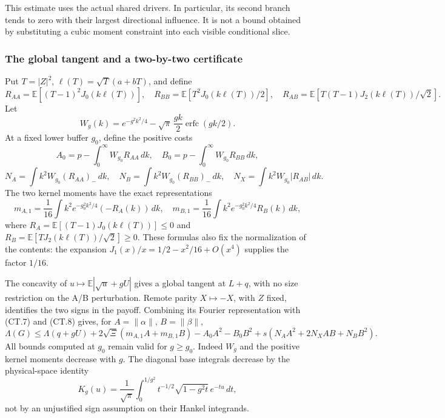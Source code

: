This estimate uses the actual shared drivers. In particular, its
second branch tends to zero with their largest directional influence.
It is not a bound obtained by substituting a cubic moment constraint
into each visible conditional slice.

\subsubsection{The global tangent and a two-by-two certificate}
Put \(T=|Z|^2\), \(\ell(T)=\sqrt T(a+bT)\), and define
\[
 R_{AA}=\mathbb E[(T-1)^2J_0(k\ell(T))],\quad
 R_{BB}=\mathbb E[T^2J_0(k\ell(T))/2],\quad
 R_{AB}=\mathbb E[T(T-1)J_2(k\ell(T))/\sqrt2].
\]
Let
\[
 W_g(k)=e^{-g^2k^2/4}-\sqrt\pi\,\frac{gk}{2}
                          \operatorname{erfc}(gk/2).
\]
At a fixed lower buffer \(g_0\), define the positive costs
\[
 A_0=p-\int_0^\infty W_{g_0}R_{AA}\,dk,\quad
 B_0=p-\int_0^\infty W_{g_0}R_{BB}\,dk,
\]
\[
 N_A=\int k^2W_{g_0}(R_{AA})_-\,dk,\quad
 N_B=\int k^2W_{g_0}(R_{BB})_-\,dk,\quad
 N_X=\int k^2W_{g_0}|R_{AB}|\,dk.
\]
The two kernel moments have the exact representations
\[
 m_{A,1}=\frac1{16}\int k^2e^{-g_0^2k^2/4}(-R_A(k))\,dk,\quad
 m_{B,1}=\frac1{16}\int k^2e^{-g_0^2k^2/4}R_B(k)\,dk,
 \tag{CT.10}
\]
where \(R_A=\mathbb E[(T-1)J_0(k\ell(T))]\le0\) and
\(R_B=\mathbb E[TJ_2(k\ell(T))/\sqrt2]\ge0\).
These formulas also fix the normalization of the contents:
the expansion \(J_1(x)/x=1/2-x^2/16+O(x^4)\) supplies the factor
\(1/16\).

The concavity of \(u\mapsto\mathbb E|\sqrt u+gU|\) gives a
global tangent at \(L+q\), with no size restriction on the A/B
perturbation. Remote parity \(X\mapsto-X\), with \(Z\) fixed,
identifies the two signs in the payoff. Combining its Fourier
representation with (CT.7) and (CT.8) gives, for
\(A=\|\alpha\|\), \(B=\|\beta\|\),
\[
 \Lambda(G)\le\Lambda(q+gU)
 +2\sqrt\Xi(m_{A,1}A+m_{B,1}B)
 -A_0A^2-B_0B^2+s(N_AA^2+2N_XAB+N_BB^2).
 \tag{CT.11}
\]
All bounds computed at \(g_0\) remain valid for \(g\ge g_0\).
Indeed \(W_g\) and the positive kernel moments decrease with \(g\).
The diagonal base integrals decrease by the physical-space identity
\[
 K_g(u)=\frac1{\sqrt\pi}\int_0^{1/g^2}
           t^{-1/2}\sqrt{1-g^2t}\,e^{-tu}\,dt,
\]
not by an unjustified sign assumption on their Hankel integrands.

